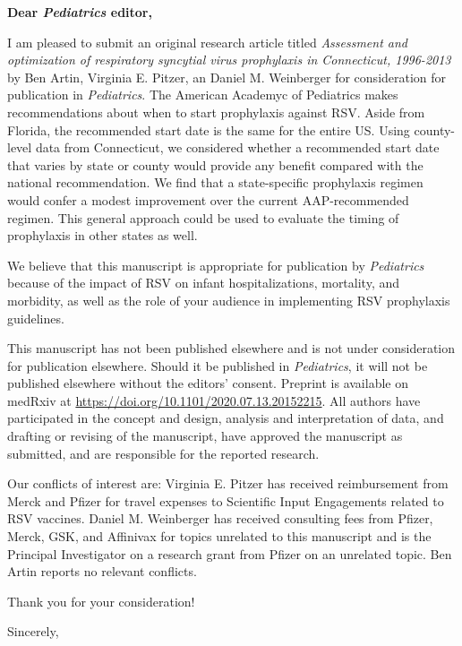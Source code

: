 \documentclass[10pt]{letter} %
\begin{document}

\begin{letter}{} %


\opening{\textbf{Dear \textit{Pediatrics} editor,}}

I am pleased to submit an original research article titled \textit{Assessment and optimization of respiratory syncytial virus prophylaxis in Connecticut, 1996-2013} by Ben Artin, Virginia E. Pitzer, an Daniel M. Weinberger for consideration for publication in \textit{Pediatrics}. The American Academyc of Pediatrics makes recommendations about when to start prophylaxis against RSV. Aside from Florida, the recommended start date is the same for the entire US. Using county-level data from Connecticut, we considered whether a recommended start date that varies by state or county would provide any benefit compared with the national recommendation. We find that a state-specific prophylaxis regimen would confer a modest improvement over the current AAP-recommended regimen. This general approach could be used to evaluate the timing of prophylaxis in other states as well.

We believe that this manuscript is appropriate for publication by \textit{Pediatrics} because of the impact of RSV on infant hospitalizations, mortality, and morbidity, as well as the role of your audience in implementing RSV prophylaxis guidelines. 

This manuscript has not been published elsewhere and is not under consideration for publication elsewhere. Should it be published in \textit{Pediatrics}, it will not be published elsewhere without the editors' consent. Preprint is available on medRxiv at \url{https://doi.org/10.1101/2020.07.13.20152215}. All authors have participated in the concept and design, analysis and interpretation of data, and drafting or revising of the manuscript, have approved the manuscript as submitted, and are responsible for the reported research.

Our conflicts of interest are: Virginia E. Pitzer has received reimbursement from Merck and Pfizer for travel expenses to Scientific Input Engagements related to RSV vaccines. Daniel M. Weinberger has received consulting fees from Pfizer, Merck, GSK, and Affinivax for topics unrelated to this manuscript and is the Principal Investigator on a research grant from Pfizer on an unrelated topic. Ben Artin reports no relevant conflicts.

Thank you for your consideration!

\vspace{2\parskip} %
\closing{Sincerely,}
\vspace{2\parskip} %


\end{letter}
 
\end{document}
